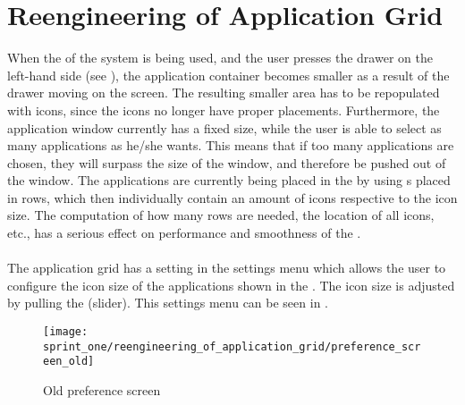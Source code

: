 
\section{Reengineering of Application Grid}
\label{sec:reengineering_of_application_grid}

When the \launcher of the \giraf system is being used, and the user presses the drawer on the left-hand side (see ), the application container becomes smaller as a result of the drawer moving on the screen. The resulting smaller area has to be repopulated with icons, since the icons no longer have proper placements. Furthermore, the application window currently has a fixed size, while the user is able to select as many applications as he/she wants. This means that if too many applications are chosen, they will surpass the size of the window, and therefore be pushed out of the window. The applications are currently being placed in the \launcher by using s placed in rows, which then individually contain an amount of icons respective to the icon size. The computation of how many rows are needed, the location of all icons, etc., has a serious effect on performance and smoothness of the \launcher. 
\\\\
The application grid has a setting in the settings menu which allows the user to configure the icon size of the applications shown in the \launcher. The icon size is adjusted by pulling the  (slider). This settings menu can be seen in .

\begin{figure}[!htbp]
    \centering
    \texttt{[image: sprint\_one/reengineering\_of\_application\_grid/preference\_screen\_old]}
    \caption{Old preference screen}
    \label{fig:preference_screen_old}
\end{figure}

